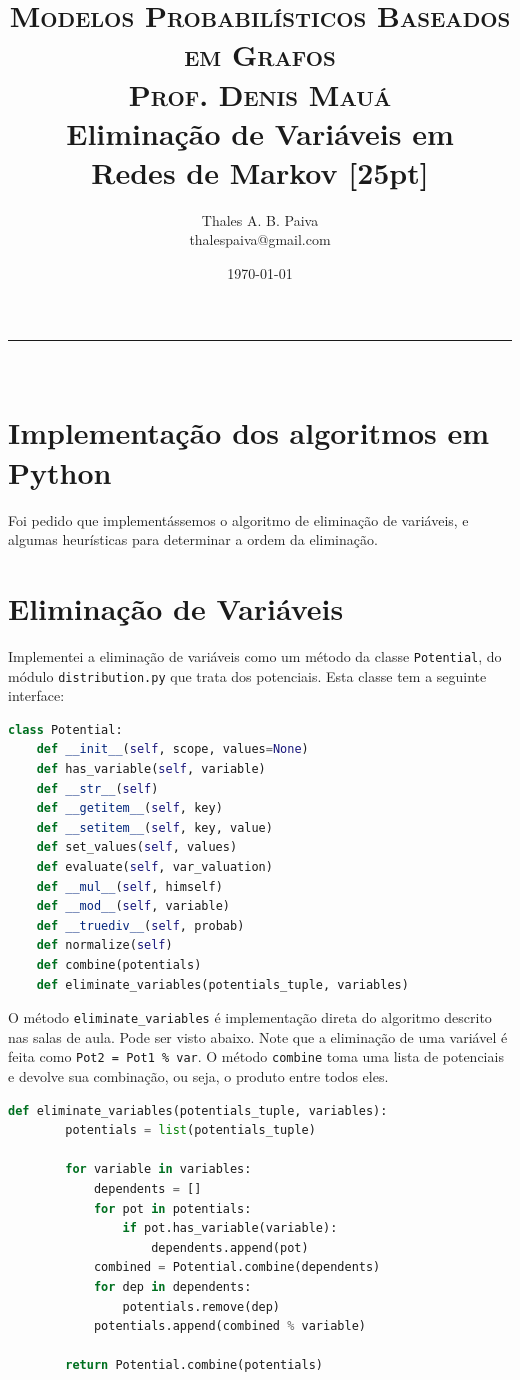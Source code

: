 \documentclass[paper=a4, fontsize=11pt]{scrartcl} %
\title{	
\normalfont \normalsize 
\textsc{Modelos Probabilísticos Baseados em Grafos} \\ 
\textsc{Prof. Denis Mauá} \\ [25pt]
\huge Eliminação de Variáveis em\\ Redes de Markov [25pt]
}
\author{Thales A. B. Paiva \\ thalespaiva@gmail.com} %
\date{\today} %
\numberwithin{equation}{subsection}
\numberwithin{figure}{subsection}
\numberwithin{table}{subsection}
\numberwithin{definition}{subsection}
\numberwithin{theorem}{subsection}
\numberwithin{property}{subsection}
\numberwithin{proposition}{subsection}
\numberwithin{equation}{section}
\numberwithin{figure}{section}
\numberwithin{table}{section}
\numberwithin{definition}{section}
\numberwithin{theorem}{section}
\numberwithin{property}{section}
\numberwithin{proposition}{section}
\newcommand{\horrule}[1]{\rule{\linewidth}{#1}} %
\begin{document}
\maketitle %
\horrule{1pt} \\[0.5cm] %

\tableofcontents

\pagebreak
\section{Implementação dos algoritmos em Python}

Foi pedido que implementássemos o algoritmo de eliminação de variáveis, e algumas heurísticas para determinar a ordem da eliminação. 

\section{Eliminação de Variáveis}

Implementei a eliminação de variáveis como um método da classe \verb|Potential|, do módulo \verb|distribution.py| que trata dos potenciais. Esta classe tem a seguinte interface:

\begin{lstlisting}[language=python]
class Potential:
    def __init__(self, scope, values=None)
    def has_variable(self, variable)
    def __str__(self)
    def __getitem__(self, key)
    def __setitem__(self, key, value)
    def set_values(self, values)
    def evaluate(self, var_valuation)
    def __mul__(self, himself)
    def __mod__(self, variable)
    def __truediv__(self, probab)
    def normalize(self)
    def combine(potentials)
    def eliminate_variables(potentials_tuple, variables)
\end{lstlisting}


O método \verb|eliminate_variables| é implementação direta do algoritmo descrito nas salas de aula. Pode ser visto abaixo. Note que a eliminação de uma variável é feita como \verb|Pot2 = Pot1 % var|. O método \verb|combine| toma uma lista de potenciais e devolve sua combinação, ou seja, o produto entre todos eles.

\begin{lstlisting}[language=python]
    def eliminate_variables(potentials_tuple, variables):
        potentials = list(potentials_tuple)

        for variable in variables:
            dependents = []
            for pot in potentials:
                if pot.has_variable(variable):
                    dependents.append(pot)
            combined = Potential.combine(dependents)
            for dep in dependents:
                potentials.remove(dep)
            potentials.append(combined % variable)

        return Potential.combine(potentials)
\end{lstlisting}
\end{document}
